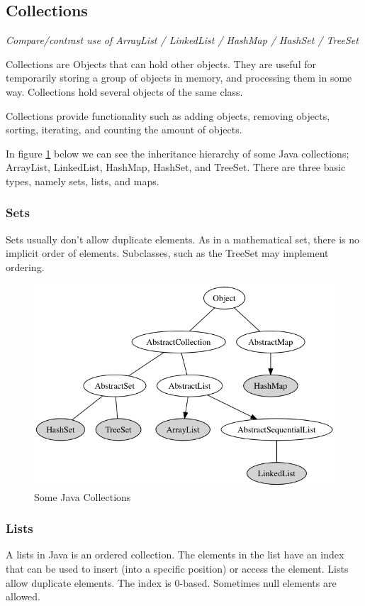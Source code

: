 \subsection{Collections}
\textit{Compare/contrast use of ArrayList / LinkedList / HashMap / HashSet / TreeSet}

Collections are Objects that can hold other objects. They are useful for temporarily storing a group of objects in memory, and processing them in some way. Collections hold several objects of the same class. 

Collections provide functionality such as adding objects, removing objects, sorting, iterating, and counting the amount of objects.

In figure \ref{fig:collections} below we can see the inheritance hierarchy of some Java collections; ArrayList, LinkedList, HashMap, HashSet, and TreeSet. There are three basic types, namely sets, lists, and maps.

\subsubsection{Sets}
Sets usually don't allow duplicate elements. As in a mathematical set, there is no implicit order of elements. Subclasses, such as the TreeSet may implement ordering.\cite{set}
\begin{figure}[!h]\centering
\includegraphics[width=\linewidth, frame]{collections.png}
\caption{Some Java Collections}
\label{fig:collections}
\end{figure}
\subsubsection{Lists}
A lists in Java is an ordered collection. The elements in the list have an index that can be used to insert (into a specific position) or access the element. Lists allow duplicate elements. The index is 0-based. Sometimes null elements are allowed.\cite{list}

